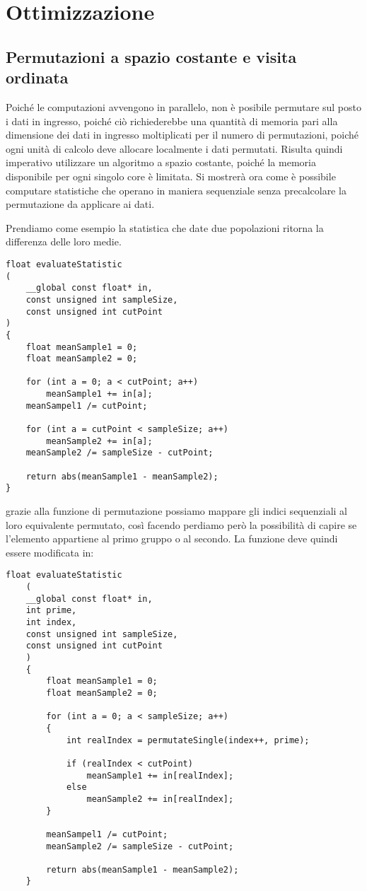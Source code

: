 \section{Ottimizzazione} \label{ottimizzazione}

\subsection{Permutazioni a spazio costante e visita ordinata}
Poiché le computazioni avvengono in parallelo, non è posibile permutare sul posto i dati in ingresso, poiché ciò richiederebbe una quantità di memoria pari alla dimensione dei dati in ingresso moltiplicati per il numero di permutazioni, poiché ogni unità di calcolo deve allocare localmente i dati permutati. Risulta quindi imperativo utilizzare un algoritmo a spazio costante, poiché la memoria disponibile per ogni singolo core è limitata.
Si mostrerà ora come è possibile computare statistiche che operano in maniera sequenziale senza precalcolare la permutazione da applicare ai dati.

Prendiamo come esempio la statistica che date due popolazioni ritorna la differenza delle loro medie.

\begin{lstlisting}[style=CStyle]
float evaluateStatistic
(
	__global const float* in, 
	const unsigned int sampleSize, 
	const unsigned int cutPoint
)
{
	float meanSample1 = 0;
	float meanSample2 = 0;
	
	for (int a = 0; a < cutPoint; a++)
		meanSample1 += in[a];
	meanSampel1 /= cutPoint;
		
	for (int a = cutPoint < sampleSize; a++)
		meanSample2 += in[a];
	meanSample2 /= sampleSize - cutPoint;	
	
	return abs(meanSample1 - meanSample2);
}
\end{lstlisting}

grazie alla funzione di permutazione possiamo mappare gli indici sequenziali al loro equivalente permutato, così facendo perdiamo però la possibilità di capire se l'elemento appartiene al primo gruppo o al secondo.
La funzione deve quindi essere modificata in:

\begin{lstlisting}[style=CStyle]
	float evaluateStatistic
	(
	__global const float* in,
	int prime,
	int index,
	const unsigned int sampleSize, 
	const unsigned int cutPoint
	)
	{
		float meanSample1 = 0;
		float meanSample2 = 0;
		
		for (int a = 0; a < sampleSize; a++)
		{
			int realIndex = permutateSingle(index++, prime);
			
			if (realIndex < cutPoint)
				meanSample1 += in[realIndex];
			else
				meanSample2 += in[realIndex];
		}
		
		meanSampel1 /= cutPoint;
		meanSample2 /= sampleSize - cutPoint;	
		
		return abs(meanSample1 - meanSample2);
	}
\end{lstlisting}


